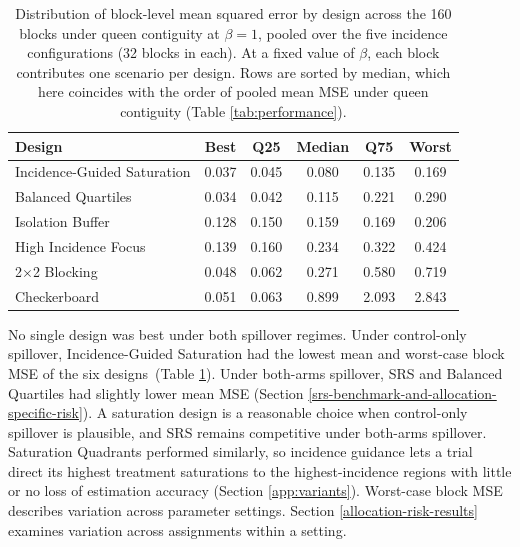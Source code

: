 \documentclass[11pt]{article}
\begin{document}
\iffullsi
\begin{table}[!htb]

\small
\centering

\caption{Distribution of block-level mean squared error by design across the 160 blocks under queen contiguity at $\beta = 1$, pooled over the five incidence configurations (32 blocks in each). At a fixed value of $\beta$, each block contributes one scenario per design. Rows are sorted by median, which here coincides with the order of pooled mean MSE under queen contiguity (Table \ref{tab:performance}).}
\label{tab:robustness}

\begin{tabular}{lccccc}

\toprule
Design & Best & Q25 & Median & Q75 & Worst \\

\midrule
Incidence-Guided Saturation & 0.037 & 0.045 & 0.080 & 0.135 & 0.169 \\
Balanced Quartiles & 0.034 & 0.042 & 0.115 & 0.221 & 0.290 \\
Isolation Buffer & 0.128 & 0.150 & 0.159 & 0.169 & 0.206 \\
High Incidence Focus & 0.139 & 0.160 & 0.234 & 0.322 & 0.424 \\
2$\times$2 Blocking & 0.048 & 0.062 & 0.271 & 0.580 & 0.719 \\
Checkerboard & 0.051 & 0.063 & 0.899 & 2.093 & 2.843 \\

\bottomrule

\end{tabular}

\end{table}
\fi

No single design was best under both spillover regimes. Under
control-only spillover, Incidence-Guided Saturation had the lowest
mean and worst-case block MSE of the six designs\iffullsi\ (Table
\ref{tab:robustness})\fi. Under both-arms spillover, SRS and Balanced
Quartiles had slightly lower mean MSE (Section
\ref{srs-benchmark-and-allocation-specific-risk}). A saturation design
is a reasonable choice when control-only spillover is plausible, and SRS
remains competitive under both-arms spillover. Saturation Quadrants
performed similarly, so incidence guidance lets a trial direct its
highest treatment saturations to the highest-incidence regions with
little or no loss of estimation accuracy (Section \ref{app:variants}).
Worst-case block MSE describes variation across parameter settings.
Section \ref{allocation-risk-results} examines variation across
assignments within a setting.
\end{document}
